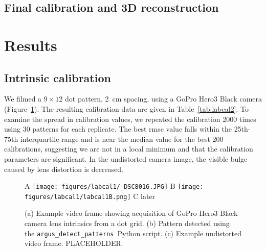 \documentclass[fleqn,10pt]{wlpeerj}
\newcommand{\detectpatterns}{\texttt{argus\_detect\_patterns}}
\begin{document}
\subsection*{Final calibration and 3D reconstruction}








\section*{Results}

\subsection*{Intrinsic calibration}
We filmed a $9 \times 12$ dot pattern, \SI{2}{\centi\meter} spacing, using a GoPro Hero3 Black camera (Figure~\ref{fig:labcal1}).  The resulting calibration data are given in Table~\ref{tab:labcal2}. To examine the spread in calibration values, we repeated the calibration 2000 times using 30 patterns for each replicate. The best rmse value falls within the 25th-75th interquartile range and is near the median value for the best 200 calibrations, suggesting we are not in a local minimum and that the calibration parameters are significant.  In the undistorted camera image, the visible bulge caused by lens distortion is decreased. 


\begin{figure}
\caption{(a) Example video frame showing acquisition of GoPro Hero3 Black camera lens intrinsics from a dot grid.  (b) Pattern detected using the \detectpatterns\ Python script. (c) Example undistorted video frame. PLACEHOLDER. 
}%
\label{fig:labcal1}
A \texttt{[image: figures/labcal1/\_DSC8016.JPG]}
B \texttt{[image: figures/labcal1/labcal1B.png]}
C later
\end{figure}
\end{document}
